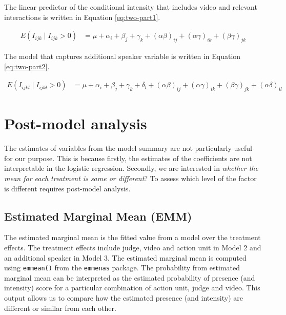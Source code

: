 \documentclass{monashthesis}
\begin{document}
The linear predictor of the conditional intensity that includes video and relevant interactions is written in Equation \ref{eq:two-part1}.

\begin{align}\label{eq:two-part1}
E(I_{ijk} \mid I_{ijk} > 0) &= \mu + \alpha_i + \beta_j +\gamma_k + (\alpha\beta)_{ij} + (\alpha\gamma)_{ik} + (\beta\gamma)_{jk}
\end{align}

The model that captures additional speaker variable is written in Equation \ref{eq:two-part2}.

\begin{align}\label{eq:two-part2}
E(I_{ijkl} \mid I_{ijkl} > 0) &= \mu + \alpha_i + \beta_j +\gamma_k + \delta_l + (\alpha\beta)_{ij} + (\alpha\gamma)_{ik} + (\beta\gamma)_{jk} + (\alpha\delta)_{il}
\end{align}

\hypertarget{post-model-analysis}{%
\section{Post-model analysis}\label{post-model-analysis}}

The estimates of variables from the model summary are not particularly useful for our purpose. This is because firstly, the estimates of the coefficients are not interpretable in the logistic regression. Secondly, we are interested in \emph{whether the mean for each treatment is same or different}? To assess which level of the factor is different requires post-model analysis.

\hypertarget{estimated-marginal-mean-emm}{%
\subsection{Estimated Marginal Mean (EMM)}\label{estimated-marginal-mean-emm}}

The estimated marginal mean \autocite{gelman2006data} is the fitted value from a model over the treatment effects. The treatment effects include judge, video and action unit in Model 2 and an additional speaker in Model 3. The estimated marginal mean is computed using \texttt{emmean()} from the \texttt{emmenas} package. The probability from estimated marginal mean can be interpreted as the estimated probability of presence (and intensity) score for a particular combination of action unit, judge and video. This output allows us to compare how the estimated presence (and intensity) are different or similar from each other.
\end{document}
